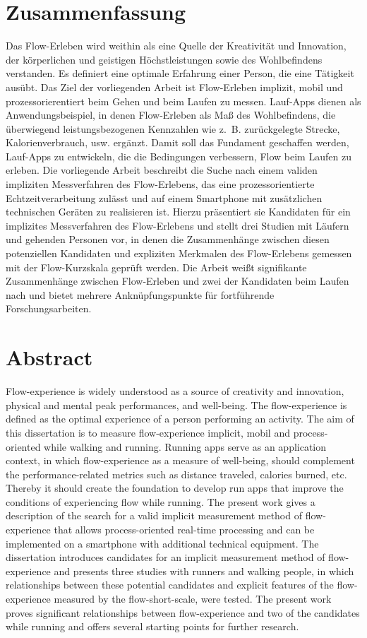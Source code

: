 

\section*{Zusammenfassung} Das Flow-Erleben wird weithin als eine Quelle der Kreativität und Innovation, der körperlichen und geistigen Höchstleistungen sowie des Wohlbefindens verstanden. Es definiert eine optimale Erfahrung einer Person, die eine Tätigkeit ausübt. Das Ziel der vorliegenden Arbeit ist Flow-Erleben implizit, mobil und prozessorierentiert beim Gehen und beim Laufen zu messen. Lauf-Apps dienen als Anwendungsbeispiel, in denen Flow-Erleben als Maß des Wohlbefindens, die überwiegend leistungsbezogenen Kennzahlen wie z.~B. zurückgelegte Strecke, Kalorienverbrauch, usw. ergänzt. Damit soll das Fundament geschaffen werden, Lauf-Apps zu entwickeln, die die Bedingungen verbessern, Flow beim Laufen zu erleben. Die vorliegende Arbeit beschreibt die Suche nach einem validen impliziten Messverfahren des Flow-Erlebens, das eine prozessorientierte Echtzeitverarbeitung zulässt und auf einem Smartphone mit zusätzlichen technischen Geräten zu realisieren ist. Hierzu präsentiert sie Kandidaten für ein implizites Messverfahren des Flow-Erlebens und stellt drei Studien mit Läufern und gehenden Personen vor, in denen die Zusammenhänge zwischen diesen potenziellen Kandidaten und expliziten Merkmalen des Flow-Erlebens gemessen mit der Flow-Kurzskala geprüft werden. Die Arbeit weißt signifikante Zusammenhänge zwischen Flow-Erleben und zwei der Kandidaten beim Laufen nach und bietet mehrere Anknüpfungspunkte für fortführende Forschungsarbeiten. 
\pagebreak

\section*{Abstract} Flow-experience is widely understood as a source of creativity and innovation, physical and mental peak performances, and well-being. The flow-experience is defined as the optimal experience of a person performing an activity. The aim of this dissertation is to measure flow-experience implicit, mobil and process-oriented while walking and running. Running apps serve as an application context, in which flow-experience as a measure of well-being, should complement the performance-related metrics such as distance traveled, calories burned, etc. Thereby it should create the foundation to develop run apps that improve the conditions of experiencing flow while running. The present work gives a description of the search for a valid implicit measurement method of flow-experience that allows process-oriented real-time processing and can be implemented on a smartphone with additional technical equipment. The dissertation introduces candidates for an implicit measurement method of flow-experience and presents three studies with runners and walking people, in which relationships between these potential candidates and explicit features of the flow-experience measured by the flow-short-scale, were tested. The present work proves significant relationships between flow-experience and two of the candidates while running and offers several starting points for further research. 
